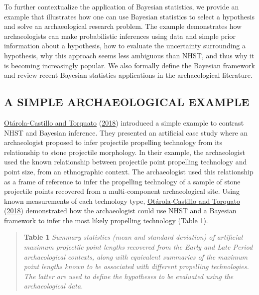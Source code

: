 \documentclass[
]{article}
\begin{document}
To further contextualize the application of Bayesian statistics, we
provide an example that illustrates how one can use Bayesian statistics
to select a hypothesis and solve an archaeological research problem. The
example demonstrates how archaeologists can make probabilistic
inferences using data and simple prior information about a hypothesis,
how to evaluate the uncertainty surrounding a hypothesis, why this
approach seems less ambiguous than NHST, and thus why it is becoming
increasingly popular. We also formally define the Bayesian framework and
review recent Bayesian statistics applications in the archaeological
literature.

\newpage

\hypertarget{a-simple-archaeological-example}{%
\subsection{A SIMPLE ARCHAEOLOGICAL
EXAMPLE}\label{a-simple-archaeological-example}}

\protect\hyperlink{ref-otarola-castillo_bayesian_2018}{Otárola-Castillo
and Torquato}
(\protect\hyperlink{ref-otarola-castillo_bayesian_2018}{2018})
introduced a simple example to contrast NHST and Bayesian inference.
They presented an artificial case study where an archaeologist proposed
to infer projectile propelling technology from its relationship to stone
projectile morphology. In their example, the archaeologist used the
known relationship between projectile point propelling technology and
point size, from an ethnographic context. The archaeologist used this
relationship as a frame of reference to infer the propelling technology
of a sample of stone projectile points recovered from a multi-component
archaeological site. Using known measurements of each technology type,
\protect\hyperlink{ref-otarola-castillo_bayesian_2018}{Otárola-Castillo
and Torquato}
(\protect\hyperlink{ref-otarola-castillo_bayesian_2018}{2018})
demonstrated how the archaeologist could use NHST and a Bayesian
framework to infer the most likely propelling technology (Table 1).

\begin{quote}
\textbf{Table 1} \emph{Summary statistics (mean and standard deviation)
of artificial maximum projectile point lengths recovered from the Early
and Late Period archaeological contexts, along with equivalent summaries
of the maximum point lengths known to be associated with different
propelling technologies. The latter are used to define the hypotheses to
be evaluated using the archaeological data.}
\end{quote}
\end{document}
